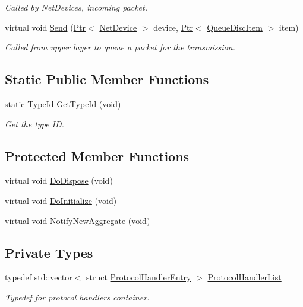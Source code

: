 \begin{DoxyCompactItemize}
\begin{DoxyCompactList}\small\item\em Called by Net\+Devices, incoming packet. \end{DoxyCompactList}\item 
virtual void \hyperlink{classns3_1_1TrafficControlLayer_aae45cb92c1adb038bac63d347632e627}{Send} (\hyperlink{classns3_1_1Ptr}{Ptr}$<$ \hyperlink{classns3_1_1NetDevice}{Net\+Device} $>$ device, \hyperlink{classns3_1_1Ptr}{Ptr}$<$ \hyperlink{classns3_1_1QueueDiscItem}{Queue\+Disc\+Item} $>$ item)
\begin{DoxyCompactList}\small\item\em Called from upper layer to queue a packet for the transmission. \end{DoxyCompactList}\end{DoxyCompactItemize}
\subsection*{Static Public Member Functions}
\begin{DoxyCompactItemize}
\item 
static \hyperlink{classns3_1_1TypeId}{Type\+Id} \hyperlink{classns3_1_1TrafficControlLayer_a6710fc399667be74683173183dbb9975}{Get\+Type\+Id} (void)
\begin{DoxyCompactList}\small\item\em Get the type ID. \end{DoxyCompactList}\end{DoxyCompactItemize}
\subsection*{Protected Member Functions}
\begin{DoxyCompactItemize}
\item 
virtual void \hyperlink{classns3_1_1TrafficControlLayer_abdb713598fd4dac736848e5cb61b79cc}{Do\+Dispose} (void)
\item 
virtual void \hyperlink{classns3_1_1TrafficControlLayer_ad9ba2e27ced5aa957e45effcbe71aba9}{Do\+Initialize} (void)
\item 
virtual void \hyperlink{classns3_1_1TrafficControlLayer_ad5d645b8add4a444261f6f263c4e4b11}{Notify\+New\+Aggregate} (void)
\end{DoxyCompactItemize}
\subsection*{Private Types}
\begin{DoxyCompactItemize}
\item 
typedef std\+::vector$<$ struct \hyperlink{structns3_1_1TrafficControlLayer_1_1ProtocolHandlerEntry}{Protocol\+Handler\+Entry} $>$ \hyperlink{classns3_1_1TrafficControlLayer_a4cb25dc01a0f3b99c59c42bf77404247}{Protocol\+Handler\+List}
\begin{DoxyCompactList}\small\item\em Typedef for protocol handlers container. \end{DoxyCompactList}\end{DoxyCompactItemize}
